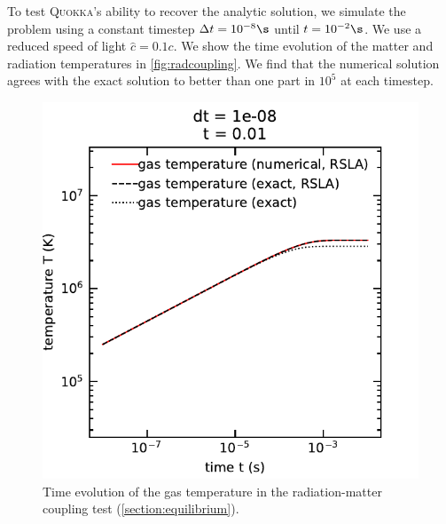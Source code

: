 \documentclass[fleqn,usenatbib]{mnras}
\newcommand{\quokka}{\textsc{Quokka}}
\begin{document}
To test \quokka's ability to recover the analytic solution, we simulate the problem using a constant timestep $\Delta t = 10^{-8} \s$ until $t = 10^{-2} \s$. We use a reduced speed of light $\hat c = 0.1 c$. We show the time evolution of the matter and radiation temperatures in \autoref{fig:radcoupling}. We find that the numerical solution agrees with the exact solution to better than one part in $10^{5}$ at each timestep.
\begin{figure}
    \includegraphics[width=\columnwidth]{radcoupling_rsla.pdf}
    \caption{Time evolution of the gas temperature in the radiation-matter coupling test (\autoref{section:equilibrium}).}
    \label{fig:radcoupling}
\end{figure}
\end{document}
